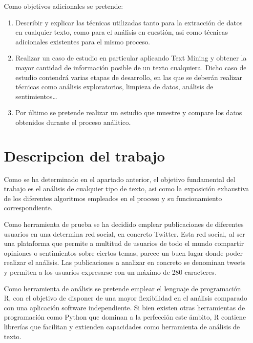 Como objetivos adicionales se pretende:
\begin{enumerate}

\item Describir y explicar las técnicas utilizadas tanto para la extracción de datos en cualquier texto, 
como para el análisis en cuestión, asi como técnicas adicionales existentes para el mismo proceso.

\item Realizar un caso de estudio en particular aplicando Text Mining y  obtener la mayor cantidad 
de información posible de un texto cualquiera. Dicho caso de estudio contendrá varias etapas 
de desarrollo, en las que se deberán realizar técnicas como análisis exploratorios, limpieza de datos,
análisis de sentimientos…

\item Por último se pretende realizar un estudio que muestre y compare los datos obtenidos durante 
el proceso análitico. 

\end{enumerate}


\section{Descripcion del trabajo}
\label{sec:descripcion}
Como se ha determinado en el apartado anterior, el objetivo fundamental del trabajo es el análisis de 
cualquier tipo de texto, asi como la exposición exhaustiva de los diferentes algoritmos empleados en 
el proceso y su funcionamiento correspondiente. 

Como herramienta de prueba se ha decidido emplear publicaciones de diferentes usuarios en una determina 
red social, en concreto Twitter. Esta red social, al ser una plataforma que permite a multitud de usuarios de 
todo el mundo compartir opiniones o sentimientos sobre ciertos temas, parece un buen lugar donde poder 
realizar el análisis. Las publicaciones a analizar en concreto se denominan tweets y permiten a los usuarios 
expresarse con un máximo de 280 caracteres.

Como herramienta de análisis se pretende emplear el lenguaje de programación R, con el objetivo de disponer 
de una mayor flexibilidad en el análisis comparado con una aplicación software independiente. Si bien existen
otras herramientas de programación como Python que dominan a la perfección este ámbito, R contiene librerías 
que facilitan y extienden capacidades como herramienta de análisis de texto.

